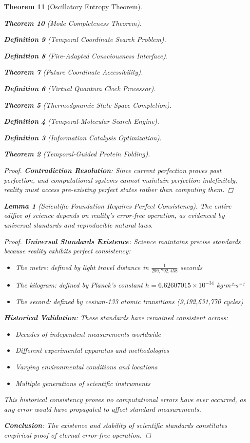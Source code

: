 \documentclass[12pt,a4paper]{article}
\newtheorem{theorem}{Theorem}[section]
\newtheorem{lemma}[theorem]{Lemma}
\newtheorem{definition}[theorem]{Definition}
\begin{document}
\begin{theorem}[Oscillatory Entropy Theorem]
\begin{theorem}[Mode Completeness Theorem]
\begin{enumerate}
\begin{definition}[Temporal Coordinate Search Problem]
\begin{algorithm}
\begin{definition}[Fire-Adapted Consciousness Interface]
\begin{theorem}[Future Coordinate Accessibility]
\begin{definition}[Virtual Quantum Clock Processor]
\begin{itemize}
\begin{itemize}
\begin{theorem}[Thermodynamic State Space Completion]
\begin{definition}[Temporal-Molecular Search Engine]
\begin{definition}[Information Catalysis Optimization]
\begin{algorithm}
\begin{theorem}[Temporal-Guided Protein Folding]
\begin{table}[h]
\begin{proof}
\textbf{Contradiction Resolution}: Since current perfection proves past perfection, and computational systems cannot maintain perfection indefinitely, reality must access pre-existing perfect states rather than computing them.
\end{proof}

\begin{lemma}[Scientific Foundation Requires Perfect Consistency]
The entire edifice of science depends on reality's error-free operation, as evidenced by universal standards and reproducible natural laws.
\end{lemma}

\begin{proof}
\textbf{Universal Standards Existence}: Science maintains precise standards because reality exhibits perfect consistency:
\begin{itemize}
    \item The metre: defined by light travel distance in $\frac{1}{299,792,458}$ seconds
    \item The kilogram: defined by Planck's constant $h = 6.62607015 \times 10^{-34}$ kg⋅m²⋅s⁻¹
    \item The second: defined by cesium-133 atomic transitions (9,192,631,770 cycles)
\end{itemize}

\textbf{Historical Validation}: These standards have remained consistent across:
\begin{itemize}
    \item Decades of independent measurements worldwide
    \item Different experimental apparatus and methodologies
    \item Varying environmental conditions and locations
    \item Multiple generations of scientific instruments
\end{itemize}

This historical consistency proves no computational errors have ever occurred, as any error would have propagated to affect standard measurements.

\textbf{Conclusion}: The existence and stability of scientific standards constitutes empirical proof of eternal error-free operation.
\end{proof}


\end{table}
\end{theorem}
\end{algorithm}
\end{definition}
\end{definition}
\end{theorem}
\end{itemize}
\end{itemize}
\end{definition}
\end{theorem}
\end{definition}
\end{algorithm}
\end{definition}
\end{enumerate}
\end{theorem}
\end{theorem}
\end{document}
